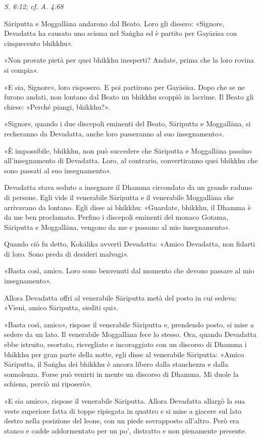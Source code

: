 \emph{S. 6:12; cf. A. 4:68}


 Sāriputta e Moggallāna andarono dal Beato. Loro gli
dissero: «Signore, Devadatta ha causato uno scisma nel Saṅgha ed è
partito per Gayāsīsa con cinquecento bhikkhu».


«Non provate pietà per quei bhikkhu inesperti? Andate, prima che la loro
rovina si compia».


«E sia, Signore», loro risposero. E poi partirono per Gayāsīsa. Dopo che
se ne furono andati, non lontano dal Beato un bhikkhu scoppiò in lacrime. Il
Beato gli chiese: «Perché piangi, bhikkhu?».


«Signore, quando i due discepoli eminenti del Beato, Sāriputta e
Moggallāna, si recheranno da Devadatta, anche loro passeranno al suo
insegnamento».


«È impossibile, bhikkhu, non può succedere che Sāriputta e Moggallāna
passino all’insegnamento di Devadatta. Loro, al contrario, convertiranno
quei bhikkhu che sono passati al suo insegnamento».


Devadatta stava seduto a insegnare il Dhamma circondato da un grande
raduno di persone. Egli vide il venerabile Sāriputta e il venerabile
Moggallāna che arrivavano da lontano. Egli disse ai bhikkhu: «Guardate,
bhikkhu, il Dhamma è da me ben proclamato. Perfino i discepoli eminenti
del monaco Gotama, Sāriputta e Moggallāna, vengono da me e passano al
mio insegnamento».


Quando ciò fu detto, Kokālika avvertì Devadatta: «Amico Devadatta, non
fidarti di loro. Sono preda di desideri malvagi».


«Basta così, amico. Loro sono benvenuti dal momento che devono passare
al mio insegnamento».


Allora Devadatta offrì al venerabile Sāriputta metà del posto in cui
sedeva: «Vieni, amico Sāriputta, siediti qui».


«Basta così, amico», rispose il venerabile Sāriputta e, prendendo posto,
si mise a sedere da un lato. Il venerabile Moggallāna fece lo stesso.
Ora, quando Devadatta ebbe istruito, esortato, risvegliato e
incoraggiato con un discorso di Dhamma i bhikkhu per gran parte della
notte, egli disse al venerabile Sāriputta: «Amico Sāriputta, il Saṅgha
dei bhikkhu è ancora libero dalla stanchezza e dalla sonnolenza. Forse
può venirti in mente un discorso di Dhamma. Mi duole la schiena, perciò
mi riposerò».


«E sia amico», rispose il venerabile Sāriputta. Allora Devadatta allargò
la sua veste superiore fatta di toppe ripiegata in quattro e si mise a
giacere sul lato destro nella posizione del leone, con un piede
sovrapposto all’altro. Però era stanco e cadde addormentato per un po’,
distratto e non pienamente presente.


